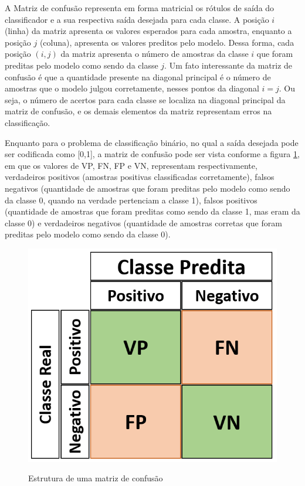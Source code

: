A Matriz de confusão  representa em forma matricial os rótulos de saída do classificador e a sua respectiva saída desejada para cada classe. A posição $i$ (linha) da matriz apresenta os valores esperados para cada amostra, enquanto a posição $j$ (coluna), apresenta os valores preditos pelo modelo. Dessa forma, cada posição $(i,j)$ da matriz apresenta o número de amostras da classe $i$ que foram preditas pelo modelo como sendo da classe $j$. Um fato interessante da matriz de confusão é que a quantidade presente na diagonal principal é o número de amostras que o modelo julgou corretamente, nesses pontos da diagonal $i=j$. Ou seja, o número de acertos para cada classe se localiza na diagonal principal da matriz de confusão, e os demais elementos da matriz representam erros na classificação.

Enquanto para o problema de classificação binário, no qual a saída desejada pode ser codificada como  [0,1], a matriz de confusão pode ser vista conforme a figura \ref{fig:matriz_confusao}, em que os valores de VP, FN, FP e VN, representam respectivamente,  verdadeiros positivos (amostras positivas classificadas corretamente),  falsos negativos (quantidade de amostras que foram preditas pelo modelo como sendo da classe 0, quando na verdade pertenciam a classe 1), falsos positivos (quantidade de amostras que foram preditas como sendo da classe 1, mas eram da classe 0) e  verdadeiros negativos (quantidade de amostras corretas que foram preditas pelo modelo como sendo da classe 0).

\begin{figure}[H]
\centering
\caption{Estrutura de uma matriz de confusão}
\includegraphics[scale = 0.45]{imgs4/matrix_confusion}
\label{fig:matriz_confusao}
\end{figure}

